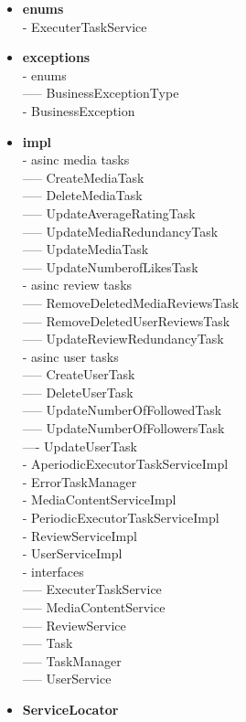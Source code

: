 \begin{itemize}
    \item \textbf{enums} \\
    - ExecuterTaskService
    \item \textbf{exceptions} \\
    - enums \\
    ----- BusinessExceptionType \\
    - BusinessException
    \item \textbf{impl} \\
    - asinc media tasks\\
    ----- CreateMediaTask\\
    ----- DeleteMediaTask\\
    ----- UpdateAverageRatingTask\\
    ----- UpdateMediaRedundancyTask\\
    ----- UpdateMediaTask\\
    ----- UpdateNumberofLikesTask\\
    - asinc review tasks\\
    ----- RemoveDeletedMediaReviewsTask\\
    ----- RemoveDeletedUserReviewsTask\\
    ----- UpdateReviewRedundancyTask\\
    - asinc user tasks\\
    ----- CreateUserTask\\
    ----- DeleteUserTask\\
    ----- UpdateNumberOfFollowedTask\\
    ----- UpdateNumberOfFollowersTask\\
    ---- UpdateUserTask\\
    - AperiodicExecutorTaskServiceImpl\\
    - ErrorTaskManager\\
    - MediaContentServiceImpl\\
    - PeriodicExecutorTaskServiceImpl\\
    - ReviewServiceImpl\\
    - UserServiceImpl\\
    - interfaces \\
    ----- ExecuterTaskService\\
    ----- MediaContentService\\
    ----- ReviewService\\
    ----- Task\\
    ----- TaskManager\\
    ----- UserService
    \item \textbf{ServiceLocator}
\end{itemize}

